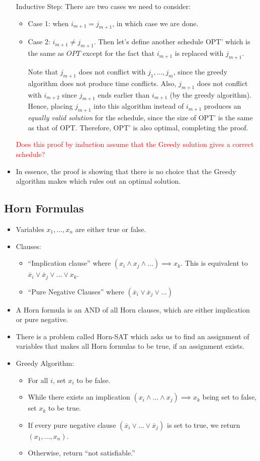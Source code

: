 \documentclass[10pt]{article}
\newcommand{\question}[1]{\textcolor{red}{#1}}
\begin{document}
\begin{itemize}
			Inductive Step: There are two cases we need to consider:
			\begin{itemize}
				\item Case 1: when $i_{m+1} = j_{m+1}$, in which case we are done.
				\item Case 2: $i_{m+1} \neq j_{m+1}$. Then let's define another schedule OPT' which is 
					the same as $OPT$ except for the fact that $i_{m+1}$ is replaced with $j_{m+1}$. 

					Note that $j_{m+1}$ does not conflict with $j_1, \dots, j_m$, since the greedy algorithm does
					not produce time conflicts. 
					Also, $j_{m+1}$ does not conflict with 
					$i_{m+2}$ since $j_{m+1}$ ends earlier than $i_{m+1}$ (by the greedy algorithm). Hence, 
					placing $j_{m+1}$ into this algorithm instead of $i_{m+1}$ produces an \textit{equally 
					valid solution} for the schedule, since the size of OPT' is the same as that of OPT. 
					Therefore, OPT' is also optimal, completing the proof.
			\end{itemize}
			\question{Does this proof by induction assume that the Greedy solution gives a correct 
			schedule?}
		\item In essence, the proof is showing that there is no choice that the Greedy algorithm makes which 
			rules out an optimal solution. 
	\end{itemize}
	\subsection{Horn Formulas}
	\begin{itemize}
		\item Variables $x_1, \dots, x_n$ are either true or false.  
		\item Clauses: 
			\begin{itemize}
				\item ``Implication clause'' where $(x_i \land x_j \land \dots) \implies x_k$. This is 
					equivalent to $\overline x_i \lor \overline x_j \lor \dots \lor x_k$.
				\item ``Pure Negative Clauses'' where $(\overline x_i \lor \overline x_j \lor \dots )$
			\end{itemize}
		\item A Horn formula is an AND of all Horn clauses, which are either implication or pure negative.
		\item There is a problem called Horn-SAT which asks us to find an assignment of variables that makes
			all Horn formulas to be true, if an assignment exists.
		\item Greedy Algorithm: 
			\begin{itemize}
				\item For all $i$, set $x_i$ to be false. 
				\item While there exists an implication $(x_i \land \dots \land x_j) \implies x_k$ being 
					set to false, set $x_k$ to be true. 
				\item If every pure negative clause $(\overline x_i \lor \dots \lor \overline x_j)$ is 
					set to true, we return $(x_1, \dots, x_n)$. 
				\item Otherwise, return ``not satisfiable.''
			\end{itemize}
	\end{itemize}
\end{document}
